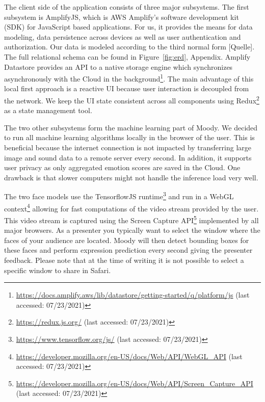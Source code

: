 The client side of the application consists of three major subsystems. The first subsystem is AmplifyJS, which is AWS Amplify’s software development kit (SDK) for JavaScript based applications. For us, it provides the means for data modeling, data persistence across devices as well as user authentication and authorization. Our data is modeled according to the third normal form [Quelle]. The full relational schema can be found in Figure~\ref{fig:erd}, Appendix. Amplify Datastore provides an API to a native storage engine which synchronizes asynchronously with the Cloud in the background\footnote{\url{https://docs.amplify.aws/lib/datastore/getting-started/q/platform/js} (last accessed: 07/23/2021)}. The main advantage of this local first approach is a reactive UI because user interaction is decoupled from the network. We keep the UI state consistent across all components using Redux\footnote{\url{https://redux.js.org/} (last accessed: 07/23/2021)} as a state management tool.

The two other subsystems form the machine learning part of Moody. We decided to run all machine learning algorithms locally in the browser of the user. This is beneficial because the internet connection is not impacted by transferring large image and sound data to a remote server every second. In addition, it supports user privacy as only aggregated emotion scores are saved in the Cloud. One drawback is that slower computers might not handle the inference load very well.

The two face models use the TensorflowJS runtime\footnote{\url{https://www.tensorflow.org/js/} (last accessed: 07/23/2021)} and run in a WebGL context\footnote{\url{https://developer.mozilla.org/en-US/docs/Web/API/WebGL_API} (last accessed: 07/23/2021)} allowing for fast computations of the video stream provided by the user. This video stream is captured using the Screen Capture API\footnote{\url{https://developer.mozilla.org/en-US/docs/Web/API/Screen_Capture_API} (last accessed: 07/23/2021)} implemented by all major browsers. As a presenter you typically want to select the window where the faces of your audience are located. Moody will then detect bounding boxes for these faces and perform expression prediction every second giving the presenter feedback. Please note that at the time of writing it is not possible to select a specific window to share in Safari.

